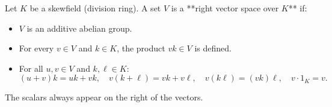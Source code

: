Let $K$ be a skewfield (division ring). A set $V$ is a **right vector space over $K$** if:
\begin{itemize}
\item $V$ is an additive abelian group.
\item For every $v \in V$ and $k \in K$, the product $vk \in V$ is defined.
\item For all $u, v \in V$ and $k, \ell \in K$:
  $$(u + v)k = uk + vk, \quad v(k + \ell) = vk + v\ell, \quad v(k\ell) = (vk)\ell, \quad v \cdot 1_K = v.$$
\end{itemize}
The scalars always appear on the right of the vectors.
